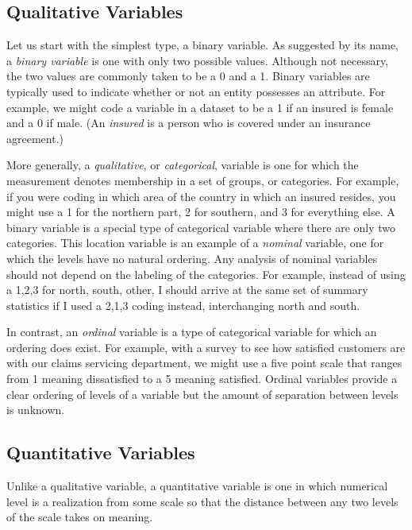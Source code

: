 \documentclass[]{book}
\theoremstyle{definition}
\theoremstyle{definition}
\theoremstyle{definition}
\theoremstyle{remark}
\begin{document}
\subsection{Qualitative Variables}\label{qualitative-variables}

Let us start with the simplest type, a binary variable. As suggested by
its name, a \emph{binary variable} is one with only two possible values.
Although not necessary, the two values are commonly taken to be a 0 and
a 1. Binary variables are typically used to indicate whether or not an
entity possesses an attribute. For example, we might code a variable in
a dataset to be a 1 if an insured is female and a 0 if male. (An
\emph{insured} is a person who is covered under an insurance agreement.)

More generally, a \emph{qualitative}, or \emph{categorical}, variable is
one for which the measurement denotes membership in a set of groups, or
categories. For example, if you were coding in which area of the country
in which an insured resides, you might use a 1 for the northern part, 2
for southern, and 3 for everything else. A binary variable is a special
type of categorical variable where there are only two categories. This
location variable is an example of a \emph{nominal} variable, one for
which the levels have no natural ordering. Any analysis of nominal
variables should not depend on the labeling of the categories. For
example, instead of using a 1,2,3 for north, south, other, I should
arrive at the same set of summary statistics if I used a 2,1,3 coding
instead, interchanging north and south.

In contrast, an \emph{ordinal} variable is a type of categorical
variable for which an ordering does exist. For example, with a survey to
see how satisfied customers are with our claims servicing department, we
might use a five point scale that ranges from 1 meaning dissatisfied to
a 5 meaning satisfied. Ordinal variables provide a clear ordering of
levels of a variable but the amount of separation between levels is
unknown.

\subsection{Quantitative Variables}\label{quantitative-variables}

Unlike a qualitative variable, a quantitative variable is one in which
numerical level is a realization from some scale so that the distance
between any two levels of the scale takes on meaning.
\end{document}
